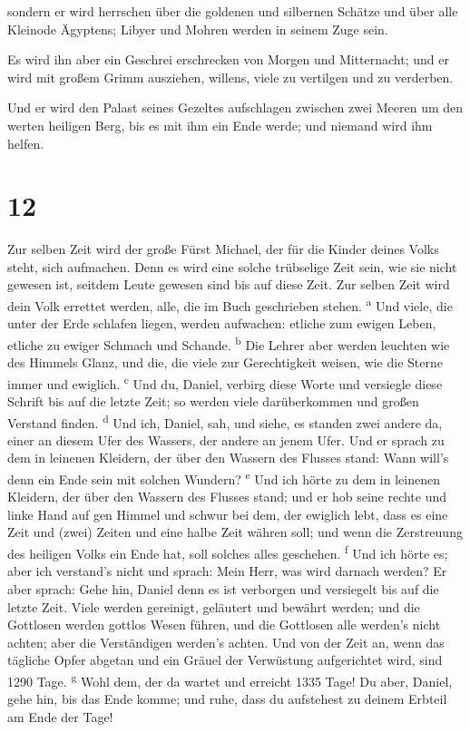  sondern er wird herrschen über die goldenen und
silbernen Schätze und über alle Kleinode Ägyptens; Libyer und Mohren
werden in seinem Zuge sein.

 Es wird ihn aber ein Geschrei erschrecken von Morgen und
Mitternacht; und er wird mit großem Grimm ausziehen, willens, viele zu
vertilgen und zu verderben.

 Und er wird den Palast seines Gezeltes aufschlagen
zwischen zwei Meeren um den werten heiligen Berg, bis es mit ihm ein
Ende werde; und niemand wird ihm helfen.

\hypertarget{section-11}{%
\section{12}\label{section-11}}

 Zur selben Zeit wird der große Fürst Michael, der für die
Kinder deines Volks steht, sich aufmachen. Denn es wird eine solche
trübselige Zeit sein, wie sie nicht gewesen ist, seitdem Leute gewesen
sind bis auf diese Zeit. Zur selben Zeit wird dein Volk errettet werden,
alle, die im Buch geschrieben stehen. \textsuperscript{a} 
Und viele, die unter der Erde schlafen liegen, werden aufwachen: etliche
zum ewigen Leben, etliche zu ewiger Schmach und Schande.
\textsuperscript{b}  Die Lehrer aber werden leuchten wie
des Himmels Glanz, und die, die viele zur Gerechtigkeit weisen, wie die
Sterne immer und ewiglich. \textsuperscript{c}  Und du,
Daniel, verbirg diese Worte und versiegle diese Schrift bis auf die
letzte Zeit; so werden viele darüberkommen und großen Verstand finden.
\textsuperscript{d}  Und ich, Daniel, sah, und siehe, es
standen zwei andere da, einer an diesem Ufer des Wassers, der andere an
jenem Ufer.  Und er sprach zu dem in leinenen Kleidern,
der über den Wassern des Flusses stand: Wann will's denn ein Ende sein
mit solchen Wundern? \textsuperscript{e}  Und ich hörte zu
dem in leinenen Kleidern, der über den Wassern des Flusses stand; und er
hob seine rechte und linke Hand auf gen Himmel und schwur bei dem, der
ewiglich lebt, dass es eine Zeit und (zwei) Zeiten und eine halbe Zeit
währen soll; und wenn die Zerstreuung des heiligen Volks ein Ende hat,
soll solches alles geschehen. \textsuperscript{f}  Und ich
hörte es; aber ich verstand's nicht und sprach: Mein Herr, was wird
darnach werden?  Er aber sprach: Gehe hin, Daniel denn es
ist verborgen und versiegelt bis auf die letzte Zeit. 
Viele werden gereinigt, geläutert und bewährt werden; und die Gottlosen
werden gottlos Wesen führen, und die Gottlosen alle werden's nicht
achten; aber die Verständigen werden's achten.  Und von
der Zeit an, wenn das tägliche Opfer abgetan und ein Gräuel der
Verwüstung aufgerichtet wird, sind 1290 Tage. \textsuperscript{g}
 Wohl dem, der da wartet und erreicht 1335 Tage!
 Du aber, Daniel, gehe hin, bis das Ende komme; und ruhe,
dass du aufstehest zu deinem Erbteil am Ende der Tage!
